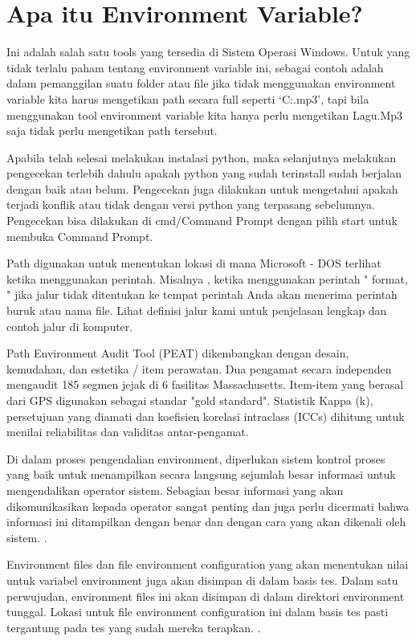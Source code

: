 
\section {Apa itu Environment Variable?}
Ini adalah salah satu tools yang tersedia di Sistem Operasi Windows. Untuk yang tidak terlalu paham tentang environment variable ini, sebagai contoh adalah dalam pemanggilan suatu folder atau file jika tidak menggunakan environment variable kita harus mengetikan path secara full seperti `C:\Music\Lagu.mp3', tapi bila menggunakan tool environment variable kita hanya perlu mengetikan Lagu.Mp3 saja tidak perlu mengetikan path tersebut.

Apabila telah selesai melakukan instalasi python, maka selanjutnya melakukan pengecekan terlebih dahulu apakah python yang sudah terinstall sudah berjalan dengan baik atau belum. Pengecekan juga dilakukan untuk mengetahui apakah terjadi konflik atau tidak dengan versi python yang terpasang sebelumnya. Pengecekan bisa dilakukan di cmd/Command Prompt dengan pilih start untuk membuka Command Prompt.

Path digunakan untuk menentukan lokasi di mana Microsoft - DOS terlihat ketika menggunakan perintah. Misalnya , ketika menggunakan perintah " format, " jika jalur tidak ditentukan ke tempat perintah Anda akan menerima perintah buruk atau nama file.  Lihat definisi jalur kami untuk penjelasan lengkap dan contoh jalur di komputer.

Path Environment Audit Tool (PEAT) dikembangkan dengan desain, kemudahan, dan estetika / item perawatan. Dua pengamat secara independen mengaudit 185 segmen jejak di 6 fasilitas Massachusetts. Item-item yang berasal dari GPS digunakan sebagai standar "gold standard". Statistik Kappa (k), persetujuan yang diamati dan koefisien korelasi intraclass (ICCs) dihitung untuk menilai reliabilitas dan validitas antar-pengamat.

Di dalam proses pengendalian environment, diperlukan sistem kontrol proses yang baik untuk menampilkan secara langsung sejumlah besar informasi untuk mengendalikan operator sistem. Sebagian besar informasi yang akan dikomunikasikan kepada operator sangat penting dan juga perlu dicermati bahwa informasi ini ditampilkan dengan benar dan dengan cara yang akan dikenali oleh sistem. \cite{kilgore1997directly}.

Environment files dan file environment configuration yang akan menentukan nilai untuk variabel environment juga akan disimpan di dalam basis tes. Dalam satu perwujudan, environment files ini akan disimpan di dalam direktori environment tunggal. Lokasi untuk file environment configuration ini dalam basis tes pasti tergantung pada tes yang sudah mereka terapkan. \cite{kilgore1997directly}.



